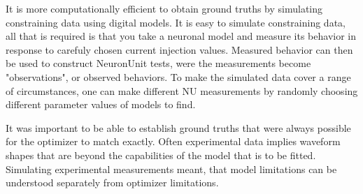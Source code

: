 It is more computationally efficient to obtain ground truths by simulating constraining data using digital models. It is easy to simulate constraining data, all that is required is that you take a neuronal model and measure its behavior in response to carefuly chosen current injection values. Measured behavior can then be used to construct NeuronUnit tests, were the measurements become "observations", or observed behaviors. To make the simulated data cover a range of circumstances, one can make different NU measurements by randomly choosing different parameter values of models to find.

It was important to be able to establish ground truths that were always possible for the optimizer to match exactly. Often experimental data implies waveform shapes that are beyond the capabilities of the model that is to be fitted. Simulating experimental measurements meant, that model limitations can be understood separately from optimizer limitations.

